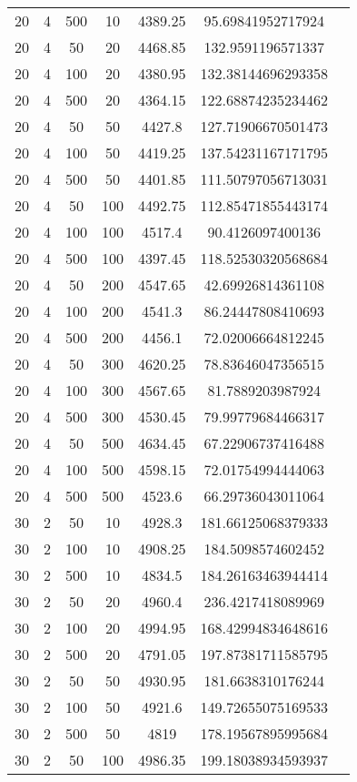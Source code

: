 {\begin{longtabu}{S
S
S
S
S
S[round-mode=places, round-precision=0]
S[round-mode=places, round-precision=0]}
20 & 4 & 500 & 10 & 4389.25 & 95.69841952717924 \\
20 & 4 & 50 & 20 & 4468.85 & 132.9591196571337 \\
20 & 4 & 100 & 20 & 4380.95 & 132.38144696293358 \\
20 & 4 & 500 & 20 & 4364.15 & 122.68874235234462 \\
20 & 4 & 50 & 50 & 4427.8 & 127.71906670501473 \\
20 & 4 & 100 & 50 & 4419.25 & 137.54231167171795 \\
20 & 4 & 500 & 50 & 4401.85 & 111.50797056713031 \\
20 & 4 & 50 & 100 & 4492.75 & 112.85471855443174 \\
20 & 4 & 100 & 100 & 4517.4 & 90.4126097400136 \\
20 & 4 & 500 & 100 & 4397.45 & 118.52530320568684 \\
20 & 4 & 50 & 200 & 4547.65 & 42.69926814361108 \\
20 & 4 & 100 & 200 & 4541.3 & 86.24447808410693 \\
20 & 4 & 500 & 200 & 4456.1 & 72.02006664812245 \\
20 & 4 & 50 & 300 & 4620.25 & 78.83646047356515 \\
20 & 4 & 100 & 300 & 4567.65 & 81.7889203987924 \\
20 & 4 & 500 & 300 & 4530.45 & 79.99779684466317 \\
20 & 4 & 50 & 500 & 4634.45 & 67.22906737416488 \\
20 & 4 & 100 & 500 & 4598.15 & 72.01754994444063 \\
20 & 4 & 500 & 500 & 4523.6 & 66.29736043011064 \\
30 & 2 & 50 & 10 & 4928.3 & 181.66125068379333 \\
30 & 2 & 100 & 10 & 4908.25 & 184.5098574602452 \\
30 & 2 & 500 & 10 & 4834.5 & 184.26163463944414 \\
30 & 2 & 50 & 20 & 4960.4 & 236.4217418089969 \\
30 & 2 & 100 & 20 & 4994.95 & 168.42994834648616 \\
30 & 2 & 500 & 20 & 4791.05 & 197.87381711585795 \\
30 & 2 & 50 & 50 & 4930.95 & 181.6638310176244 \\
30 & 2 & 100 & 50 & 4921.6 & 149.72655075169533 \\
30 & 2 & 500 & 50 & 4819 & 178.19567895995684 \\
30 & 2 & 50 & 100 & 4986.35 & 199.18038934593937 \\

\end{longtabu}}
